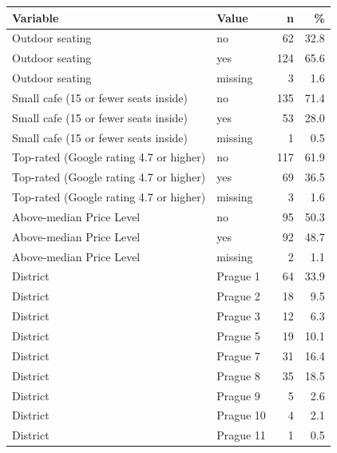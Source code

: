 \begin{tabular}{llrr}
  \toprule
Variable & Value & n & \% \\ 
  \midrule
Outdoor seating & no & 62 & 32.8 \\ 
  Outdoor seating & yes & 124 & 65.6 \\ 
  Outdoor seating & missing & 3 & 1.6 \\ 
  Small cafe (15 or fewer seats inside) & no & 135 & 71.4 \\ 
  Small cafe (15 or fewer seats inside) & yes & 53 & 28.0 \\ 
  Small cafe (15 or fewer seats inside) & missing & 1 & 0.5 \\ 
  Top-rated (Google rating 4.7 or higher) & no & 117 & 61.9 \\ 
  Top-rated (Google rating 4.7 or higher) & yes & 69 & 36.5 \\ 
  Top-rated (Google rating 4.7 or higher) & missing & 3 & 1.6 \\ 
  Above-median Price Level & no & 95 & 50.3 \\ 
  Above-median Price Level & yes & 92 & 48.7 \\ 
  Above-median Price Level & missing & 2 & 1.1 \\ 
  District & Prague 1 & 64 & 33.9 \\ 
  District & Prague 2 & 18 & 9.5 \\ 
  District & Prague 3 & 12 & 6.3 \\ 
  District & Prague 5 & 19 & 10.1 \\ 
  District & Prague 7 & 31 & 16.4 \\ 
  District & Prague 8 & 35 & 18.5 \\ 
  District & Prague 9 & 5 & 2.6 \\ 
  District & Prague 10 & 4 & 2.1 \\ 
  District & Prague 11 & 1 & 0.5 \\ 
   \bottomrule
\end{tabular}
